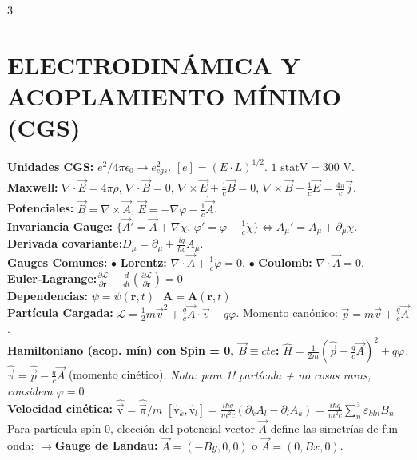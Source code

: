 \documentclass[8pt,a4paper,fleqn]{extarticle} %
\begin{document}
\begin{multicols}{3}
\section{ELECTRODINÁMICA Y ACOPLAMIENTO MÍNIMO (CGS)}
\textbf{Unidades CGS:} $e^2/4\pi\epsilon_0 \to e_{cgs}^2$. $[e] = (E \cdot L)^{1/2}$. $1\text{ statV} = 300\text{ V}$.\\
\textbf{Maxwell:} $\nabla \cdot \vec{E} = 4\pi\rho$, $\nabla \cdot \vec{B} = 0$, $\nabla \times \vec{E} + \frac{1}{c}\dot{\vec{B}} = 0$, $\nabla \times \vec{B} - \frac{1}{c}\dot{\vec{E}} = \frac{4\pi}{c}\vec{j}$.\\
\textbf{Potenciales:} $\vec{B} = \nabla \times \vec{A}$, $\vec{E} = -\nabla \varphi - \frac{1}{c}\dot{\vec{A}}$.\\
\textbf{Invariancia Gauge:} $\{\vec{A}' = \vec{A} + \nabla \chi$, $\varphi' = \varphi - \frac{1}{c}\dot{\chi} \} \Leftrightarrow A_\mu ' = A_\mu + \partial_\mu \chi$.\\
\textbf{Derivada covariante:}$D_\mu = \partial_\mu + \frac{iq}{\hbar c} A_\mu$.
\\
\textbf{Gauges Comunes:} $\bullet$ \textbf{Lorentz:} $\nabla \cdot \vec{A} + \frac{1}{c}\dot{\varphi} = 0$. $\bullet$ \textbf{Coulomb:} $\nabla \cdot \vec{A} = 0$.\\
\textbf{Euler-Lagrange:}$\frac{\partial \mathcal{L}}{\partial\mathbf{r}} - \frac{d}{dt} \left(\frac{\partial \mathcal{L}}{\partial \mathbf{\dot{r}}}\right) = 0$\\
\textbf{Dependencias:} $\psi=\psi(\mathbf{r}, t)\; \;\, \mathbf{A} = \mathbf{A}(\mathbf{r}, t)$ \\
\textbf{Partícula Cargada:} $\mathcal{L} = \frac{1}{2}m\vec{v}^2 + \frac{q}{c}\vec{A}\cdot\vec{v} - q\varphi$. Momento canónico: $\vec{p} = m\vec{v} + \frac{q}{c}\vec{A}$.\\
\textbf{Hamiltoniano (acop. mín) con Spin = 0, $\vec{B} \equiv cte$:} $\hat{H} = \frac{1}{2m}(\hat{\vec{p}} - \frac{q}{c}\vec{A})^2 + q\varphi$. $\hat{\vec{\pi}} = \hat{\vec{p}} - \frac{q}{c}\vec{A}$ (momento cinético). 
\textit{Nota: para 1! partícula + no cosas raras, considera $\varphi =0$} \\
\textbf{Velocidad cinética:} $\hat{\vec{\mathrm{v}}} = \hat{\vec{\pi}}/m$\;\;\; $[\hat{\mathrm{v}}_k, \hat{\mathrm{v}}_l] = \frac{i\hbar q}{m^2 c} (\partial_k A_l -\partial_l A_k) = \frac{i\hbar q}{m^2 c} \sum_n^3 \varepsilon_{kln} B_n $
\\
Para partícula spín 0, elección del potencial vector $\vec{A}$ define las simetrías de fun onda:
$\rightarrow$\textbf{Gauge de Landau:} $\vec{A} = (-By, 0, 0)$ o $\vec{A} = (0, Bx, 0)$.

\end{multicols}
\end{document}
